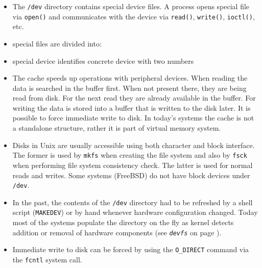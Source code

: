 \begin{slide}
\begin{itemize}
\item The \texttt{/dev} directory contains special device files.
A process opens special file via \texttt{open()} and communicates with the
device via \texttt{read()}, \texttt{write()}, \texttt{ioctl()}, etc.
\item special files are divided into:
\item special device identifies concrete device with two numbers
\end{itemize}
\end{slide}

\begin{itemize}
\item The cache speeds up operations with peripheral devices. When reading the
data is searched in the buffer first. When not present there, they are being
read from disk. For the next read they are already available in the buffer.
For writing the data is stored into a buffer that is written to the disk later.
It is possible to force immediate write to disk. In today's systems the cache is
not a standalone structure, rather it is part of virtual memory system.
\item Disks in Unix are usually accessible using both character and block
interface. The former is used by \texttt{mkfs} when creating the file system and
also by \texttt{fsck} when performing file system consistency check.
The latter is used for normal reads and writes. Some systems (FreeBSD) do not
have block devices under \texttt{/dev}.
\item In the past, the contents of the \texttt{/dev} directory had to be
refreshed by a shell script (\texttt{MAKEDEV}) or by hand whenever hardware
configuration changed. Today most of the systems populate the directory on the
fly as kernel detects addition or removal of hardware components
(see \emph{\texttt{devfs}} on page \pageref{DEVFS}).
\item Immediate write to disk can be forced by using the \texttt{O\_DIRECT}
command via the \texttt{fcntl} system call.
\end{itemize}


